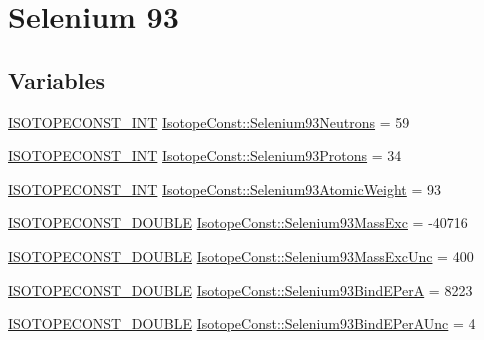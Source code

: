 \hypertarget{group___isotope_const-_selenium-_se93}{}\section{Selenium 93}
\label{group___isotope_const-_selenium-_se93}
\subsection*{Variables}
\begin{DoxyCompactItemize}
\item 
\mbox{\hyperlink{group___isotope_const-_macros_ga5f18360b3e99483a35c32d789e62621c}{I\+S\+O\+T\+O\+P\+E\+C\+O\+N\+S\+T\+\_\+\+I\+NT}} \mbox{\hyperlink{group___isotope_const-_selenium-_se93_gaa3960479e94084e73f1d31fe524edd08}{Isotope\+Const\+::\+Selenium93\+Neutrons}} = 59
\item 
\mbox{\hyperlink{group___isotope_const-_macros_ga5f18360b3e99483a35c32d789e62621c}{I\+S\+O\+T\+O\+P\+E\+C\+O\+N\+S\+T\+\_\+\+I\+NT}} \mbox{\hyperlink{group___isotope_const-_selenium-_se93_gabff3ce4a4f03539a9fa34a4c70663f41}{Isotope\+Const\+::\+Selenium93\+Protons}} = 34
\item 
\mbox{\hyperlink{group___isotope_const-_macros_ga5f18360b3e99483a35c32d789e62621c}{I\+S\+O\+T\+O\+P\+E\+C\+O\+N\+S\+T\+\_\+\+I\+NT}} \mbox{\hyperlink{group___isotope_const-_selenium-_se93_ga69d9921d7ca2c286dee64894a48c408c}{Isotope\+Const\+::\+Selenium93\+Atomic\+Weight}} = 93
\item 
\mbox{\hyperlink{group___isotope_const-_macros_ga8f45a7272ce02c0b4c65c44636ed719a}{I\+S\+O\+T\+O\+P\+E\+C\+O\+N\+S\+T\+\_\+\+D\+O\+U\+B\+LE}} \mbox{\hyperlink{group___isotope_const-_selenium-_se93_ga9ef28cd919889f0cc5aec0105d39aa93}{Isotope\+Const\+::\+Selenium93\+Mass\+Exc}} = -\/40716
\item 
\mbox{\hyperlink{group___isotope_const-_macros_ga8f45a7272ce02c0b4c65c44636ed719a}{I\+S\+O\+T\+O\+P\+E\+C\+O\+N\+S\+T\+\_\+\+D\+O\+U\+B\+LE}} \mbox{\hyperlink{group___isotope_const-_selenium-_se93_gaed763bdf01d61b63ee410a629016000b}{Isotope\+Const\+::\+Selenium93\+Mass\+Exc\+Unc}} = 400
\item 
\mbox{\hyperlink{group___isotope_const-_macros_ga8f45a7272ce02c0b4c65c44636ed719a}{I\+S\+O\+T\+O\+P\+E\+C\+O\+N\+S\+T\+\_\+\+D\+O\+U\+B\+LE}} \mbox{\hyperlink{group___isotope_const-_selenium-_se93_gacae90ccdf54b8f13d7a4254d5fddc8ef}{Isotope\+Const\+::\+Selenium93\+Bind\+E\+PerA}} = 8223
\item 
\mbox{\hyperlink{group___isotope_const-_macros_ga8f45a7272ce02c0b4c65c44636ed719a}{I\+S\+O\+T\+O\+P\+E\+C\+O\+N\+S\+T\+\_\+\+D\+O\+U\+B\+LE}} \mbox{\hyperlink{group___isotope_const-_selenium-_se93_gaae6f68f47872c79a4d97a3b67b945a2e}{Isotope\+Const\+::\+Selenium93\+Bind\+E\+Per\+A\+Unc}} = 4

\end{DoxyCompactItemize}
